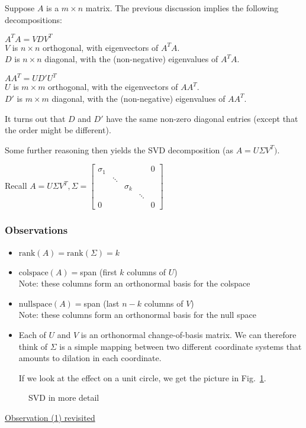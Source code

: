 Suppose $A$ is a $m \times n$ matrix. The previous discussion implies the following decompositions:
\begin{description}
    \item $A^TA=VDV^T$ \\ 
        $V$ is $n \times n$ orthogonal, with eigenvectors of $A^TA$. \\
        $D$ is $n \times n$ diagonal, with the (non-negative) eigenvalues of $A^TA$.
    \item $AA^T = UD' U^T$ \\
        $U$ is $m \times m$ orthogonal, with the eigenvectors of $AA^T$. \\
        $D'$ is $m \times m$ diagonal, with the (non-negative) eigenvalues of $AA^T$.
\end{description}

It turns out that $D$ and $D'$ have the same non-zero diagonal entries (except that the order might be different). 

Some further reasoning then yields the SVD decomposition (as $A = U \Sigma V^T)$.

Recall $A = U \Sigma V^T, \Sigma = \begin{bmatrix}
    \sigma_1 & & & & 0 \\
    & \ddots & & & \\ 
    & & \sigma_k & & \\
    & & & \ddots & \\ 
    0 & & & & 0
\end{bmatrix}$

\subsubsection*{Observations}

\begin{itemize}
    \item $\text{rank}(A) = \text{rank}(\Sigma) = k$
    \item $\text{colspace}(A) = $span (first $k$ columns of $U$) \\
        Note: these columns form an orthonormal basis for the colspace
    \item $\text{nullspace}(A) = $span (last $n-k$ columns of $V$) \\
        Note: these columns form an orthonormal basis for the null space
    \item Each of $U$ and $V$ is an orthonormal change-of-basis matrix. We can therefore think of $\Sigma$ is a simple mapping between two different coordinate systems that amounts to dilation in each coordinate. 
    
    If we look at the effect on a unit circle, we get the picture in Fig.~\ref{fig:linear-2}.
\end{itemize}

\begin{figure}[h]
  \centering
  \resizebox{\columnwidth}{!}{
    
  }
  \caption{SVD in more detail}
  \label{fig:linear-2}
\end{figure}

\underline{Observation (1) revisited}



